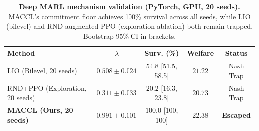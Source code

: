 \begin{table}[h]
\centering
\caption{%
  \textbf{Deep MARL mechanism validation (PyTorch, GPU, 20 seeds).}
  MACCL's commitment floor achieves 100\% survival across all seeds,
  while LIO (bilevel) and RND-augmented PPO (exploration ablation) both
  remain trapped. Bootstrap 95\% CI in brackets.
}
\label{tab:deep_marl_gpu}
\small
\begin{tabular}{@{}lcccc@{}}
\toprule
\textbf{Method} & $\bar\lambda$ & \textbf{Surv. (\%)} & \textbf{Welfare} & \textbf{Status} \\
\midrule
LIO (Bilevel, 20 seeds) & $0.508 \pm 0.024$ & $54.8$ \tiny{[51.5, 58.5]} & $21.22$ & Nash Trap \\
RND+PPO (Exploration, 20 seeds) & $0.311 \pm 0.033$ & $20.2$ \tiny{[16.3, 23.8]} & $20.73$ & Nash Trap \\
\midrule
\textbf{MACCL (Ours, 20 seeds)} & $\mathbf{0.991} \pm 0.001$ & $\mathbf{100.0}$ \tiny{[100, 100]} & $\mathbf{22.38}$ & \textbf{Escaped} \\
\bottomrule
\end{tabular}
\end{table}
